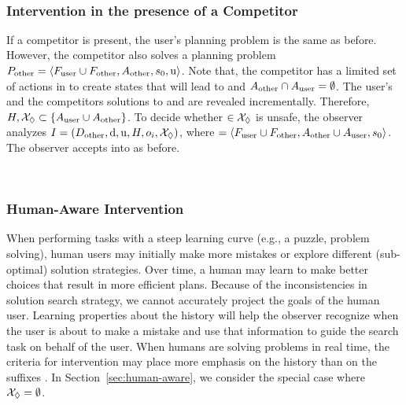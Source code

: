 

~\subsubsection{Intervention in the presence of a Competitor}
If a competitor is present, the user's planning problem \problemUser  is the same as before. 
However, the competitor also solves a planning problem $P_{\textnormal{other}}=\langle F_{\textnormal{user}} \cup F_{\textnormal{other}}, A_{\textnormal{other}}, s_0, \mathrm{u}\rangle$.
Note that, the competitor has a limited set of actions in \actionsOther to create states that will lead to \undesired and $A_{\textnormal{other}}\cap A_{\textnormal{user}}=\emptyset$.
The user's and the competitors solutions to \problemUser and \problemOther are revealed incrementally.
Therefore, $H,\mathcal{X}_\Diamond \subset \lbrace A_{\textnormal{user}}\cup A_{\textnormal{other}}\rbrace$. 
To decide whether \Suffix $\in\mathcal{X}_\Diamond$ is unsafe, the observer analyzes $I = (D_{\textnormal{other}}, \mathrm{d}, \mathrm{u}, H, o_i, \mathcal{X}_\Diamond)$, where \domainOther$=\langle F_{\textnormal{user}} \cup F_{\textnormal{other}},A_{\textnormal{other}}\cup A_{\textnormal{user}},s_0\rangle$.
The observer accepts \presentedAction into \historyDef as before.


~\subsubsection{Human-Aware Intervention}
When performing tasks with a steep learning curve (e.g., a puzzle, problem solving), 
human users may initially make more mistakes or explore different (sub-optimal) solution strategies. 
Over time, a human may learn to make better choices that result in more efficient plans. 
Because of the inconsistencies in solution search strategy, we cannot accurately project the goals of the human user.
Learning properties about the history \historyDef will help the observer recognize when the user is about to make a mistake and use that information to guide the search task on behalf of the user.
When humans are solving problems in real time, the criteria for intervention
may place more emphasis on the history \historyDef than on the suffixes \Suffixes.
In Section~\ref{sec:human-aware}, we consider the special case where $\mathcal{X}_\Diamond = \emptyset$.



